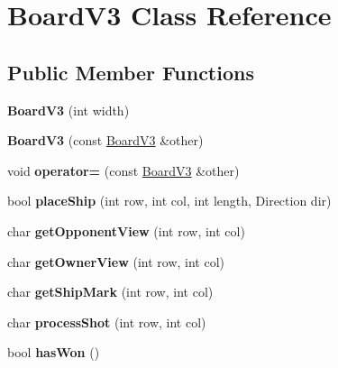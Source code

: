 \hypertarget{classBoardV3}{}\section{Board\+V3 Class Reference}
\label{classBoardV3}
\subsection*{Public Member Functions}
\begin{DoxyCompactItemize}
\item 
{\bfseries Board\+V3} (int width)\hypertarget{classBoardV3_ade1d3c375ff61a0070f3d9ac6cd74456}{}\label{classBoardV3_ade1d3c375ff61a0070f3d9ac6cd74456}

\item 
{\bfseries Board\+V3} (const \hyperlink{classBoardV3}{Board\+V3} \&other)\hypertarget{classBoardV3_a9bc1601103a259c5eeab2542d30d1f24}{}\label{classBoardV3_a9bc1601103a259c5eeab2542d30d1f24}

\item 
void {\bfseries operator=} (const \hyperlink{classBoardV3}{Board\+V3} \&other)\hypertarget{classBoardV3_aae7b20b88ada61181d462fd6fb6fe588}{}\label{classBoardV3_aae7b20b88ada61181d462fd6fb6fe588}

\item 
bool {\bfseries place\+Ship} (int row, int col, int length, Direction dir)\hypertarget{classBoardV3_ac231ec94cf8da74fd9d3da25f624c166}{}\label{classBoardV3_ac231ec94cf8da74fd9d3da25f624c166}

\item 
char {\bfseries get\+Opponent\+View} (int row, int col)\hypertarget{classBoardV3_a1a04d363a7f49bb415ab8e1f5a824c97}{}\label{classBoardV3_a1a04d363a7f49bb415ab8e1f5a824c97}

\item 
char {\bfseries get\+Owner\+View} (int row, int col)\hypertarget{classBoardV3_adb0dfc8a5cabf7f107f4e22b4cec217f}{}\label{classBoardV3_adb0dfc8a5cabf7f107f4e22b4cec217f}

\item 
char {\bfseries get\+Ship\+Mark} (int row, int col)\hypertarget{classBoardV3_ad6c606b899f14ffe901985dd41ce0939}{}\label{classBoardV3_ad6c606b899f14ffe901985dd41ce0939}

\item 
char {\bfseries process\+Shot} (int row, int col)\hypertarget{classBoardV3_ad562fecd0488d555f590d9dee133530b}{}\label{classBoardV3_ad562fecd0488d555f590d9dee133530b}

\item 
bool {\bfseries has\+Won} ()\hypertarget{classBoardV3_a33e2a9734bb17282649dceca85d4b7f5}{}\label{classBoardV3_a33e2a9734bb17282649dceca85d4b7f5}

\end{DoxyCompactItemize}
